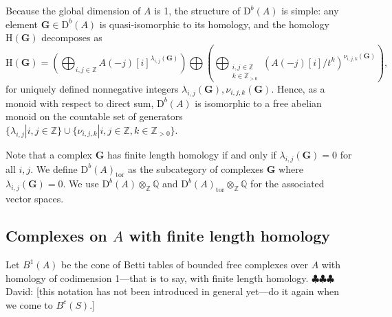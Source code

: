 \documentclass[12pt]{amsart}
\theoremstyle{definition}
\theoremstyle{remark}
\newcommand{\HH}{\mathrm{H}}
\newcommand{\ZZ}{\mathbb{Z}}
\newcommand{\QQ}{\mathbb{Q}}
\newcommand{\Gbull}{\mathbf{G}}
\newcommand{\DD}{\mathrm{D}}
\newcommand{\david}[1]{{\color{red} \sf $\clubsuit\clubsuit\clubsuit$ David: [#1]}}
\begin{document}
Because the global dimension of $A$ is 1, the structure of $\DD^b(A)$ is simple: any element $\Gbull\in \DD^b(A)$ is quasi-isomorphic to its homology, and the homology $\HH(\Gbull)$ decomposes as
\[
\HH(\Gbull)=\left( \bigoplus_{i,j\in \ZZ} A(-j)[i]^{\lambda_{i,j}(\Gbull)}\right) \bigoplus \left( \bigoplus_{\substack{i,j\in \ZZ\\ k\in \ZZ_{>0}}} (A(-j)[i]/t^k)^{\nu_{i,j,k}(\Gbull)}\right),
\]
for uniquely defined nonnegative integers $\lambda_{i,j}(\Gbull), \nu_{i,j,k}(\Gbull)$.  Hence, as a monoid with respect to direct sum, $\DD^b(A)$ is isomorphic to a free abelian monoid on the countable set of generators $\{\lambda_{i,j} | i,j\in \ZZ\} \cup \{ \nu_{i,j,k}  | i,j\in \ZZ, k\in \ZZ_{>0}\}$. 

Note that a complex $\Gbull$ has finite length homology if and only if $\lambda_{i,j}(\Gbull)=0$ for all $i,j$.  We  define $\DD^b(A)_{\text{tor}}$ as the subcategory of complexes $\Gbull$ where $\lambda_{i,j}(\Gbull)=0$.  We use $\DD^b(A)\otimes_{\ZZ} \QQ$ and $\DD^b(A)_{\text{tor}}\otimes_{\ZZ} \QQ$ for the associated vector spaces.


\subsection{Complexes on $A$ with finite length homology}\label{sec:PP0}
Let $B^{1}(A)$ be the cone of Betti tables of bounded free complexes over $A$ with 
homology of codimension 1---that is to say, with finite length homology. \david{this notation has
not been introduced in general yet---do it again when we come to $B^{c}(S)$.}
\end{document}
